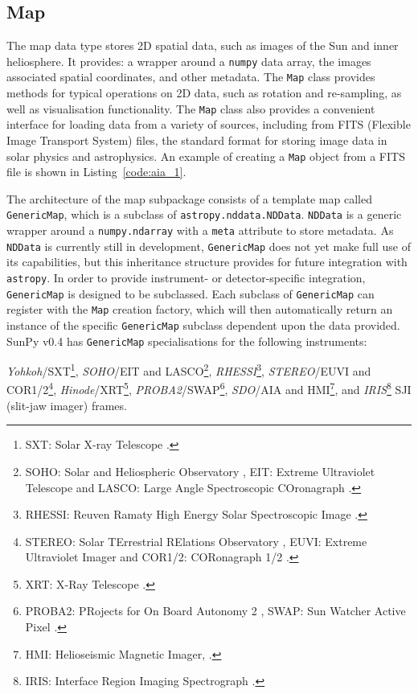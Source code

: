 \subsection{Map}\label{ssec:map}
The map data type stores 2D spatial data, such as images of the Sun and 
inner heliosphere. It provides: a wrapper around a \texttt{numpy} data array, 
the images associated spatial coordinates, and other metadata. The \texttt{Map} 
class provides methods for typical operations on 2D data, such as rotation and 
re-sampling, as well as visualisation functionality.
The \texttt{Map} class also provides a convenient interface for loading data 
from a variety of sources, including from FITS (Flexible Image Transport System) files, the standard format for storing image data in solar physics and astrophysics. An example of creating a \texttt{Map} object from a FITS file is shown in 
Listing~\ref{code:aia_1}.


The architecture of the map subpackage consists of a template map called
\texttt{GenericMap}, which is a subclass of \texttt{astropy.nddata.NDData}. 
\texttt{NDData} is a generic wrapper around a \texttt{numpy.ndarray} with a 
\texttt{meta} attribute to store metadata.
As \texttt{NDData} is currently still in development, \texttt{GenericMap} does 
not yet make full use of its capabilities, but this inheritance structure 
provides for future integration with \texttt{astropy}. In order to provide 
instrument- or detector-specific integration, \texttt{GenericMap} is designed
to be subclassed. Each subclass of \texttt{GenericMap} can register 
with the \texttt{Map} creation factory, which will then automatically return an instance
of the specific \texttt{GenericMap} subclass dependent upon the data provided. 
SunPy v0.4 has \texttt{GenericMap} specialisations for the following 
instruments: 

\textit{Yohkoh}/SXT\footnote{SXT: Solar X-ray Telescope \citep{1991SoPh..136....1O, 1991SoPh..136...37T}.},
\textit{SOHO}/EIT and LASCO\footnote{SOHO: Solar and Heliospheric Observatory \citep{domingo1995}, EIT: Extreme Ultraviolet Telescope \citep{1995SoPh..162..291D} and LASCO: Large Angle Spectroscopic COronagraph \citep{1995SoPh..162..357B}.},
\textit{RHESSI}\footnote{RHESSI: Reuven Ramaty High Energy Solar Spectroscopic Image \citep{2002SoPh..210....3L}.},
\textit{STEREO}/EUVI and COR1/2\footnote{STEREO: Solar TErrestrial RElations Observatory \citep{2005AdSpR..36.1483K}, EUVI: Extreme Ultraviolet Imager \citep{2004SPIE.5171..111W} and COR1/2: CORonagraph 1/2 \citep{2002AdSpR..29.2017H}.},
\textit{Hinode}/XRT\footnote{XRT: X-Ray Telescope \citep{2007SoPh..243....3K, 2007SoPh..243...63G}.},
\textit{PROBA2}/SWAP\footnote{PROBA2: PRojects for On Board Autonomy 2 \citep{2013SoPh..286....5S}, SWAP: Sun Watcher Active Pixel \citep{2013SoPh..286...43S}.},
\textit{SDO}/AIA and HMI\footnote{HMI: Helioseismic Magnetic Imager, \citep{2012SoPh..275..207S}.}, and
\textit{IRIS}\footnote{IRIS: Interface Region Imaging Spectrograph \citep{2011SPD....42.1512L}.} SJI (slit-jaw imager) frames.
                        
